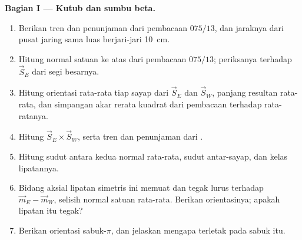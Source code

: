 \begin{problem}
\medskip\noindent\textbf{Bagian I --- Kutub dan sumbu beta.}
\begin{enumerate}
  \item Berikan tren dan penunjaman  dari pembacaan $075/13$, dan
        jaraknya dari pusat jaring sama luas berjari-jari
        \qty{10}{cm}.
  \item Hitung normal satuan ke atas dari pembacaan $075/13$; periksanya
        terhadap $\vec S_E$ dari segi besarnya.
  \item Hitung orientasi rata-rata tiap sayap dari $\vec S_E$ dan $\vec S_W$,
        panjang resultan rata-rata, dan simpangan akar rerata kuadrat dari
        pembacaan terhadap rata-ratanya.
  \item Hitung $\vec S_E\times\vec S_W$, serta tren dan penunjaman
        dari .
  \item Hitung sudut antara kedua normal rata-rata, sudut antar-sayap,
        dan kelas lipatannya.
  \item Bidang aksial lipatan simetris ini memuat  dan
        tegak lurus terhadap $\vec m_E - \vec m_W$, selisih normal satuan rata-rata.
        Berikan orientasinya; apakah lipatan itu tegak?
  \item Berikan orientasi sabuk-$\pi$, dan jelaskan mengapa  terletak
        pada sabuk itu.
\end{enumerate}


\end{problem}
